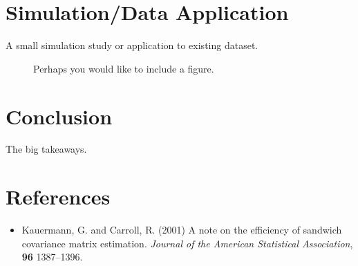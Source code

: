 \documentclass[english, 11pt]{article}
\begin{document}
\section{Simulation/Data Application}

A small simulation study or application to existing dataset.

\begin{figure}[H]
\begin{minipage}[t]{1\columnwidth}
\begin{center}
\par\end{center}%
\end{minipage}\protect\caption{Perhaps you would like to include a figure.}
\end{figure}









\section{Conclusion}

The big takeaways.







\section*{References}

\begin{itemize}

\item Kauermann, G. and Carroll, R. (2001)
A note on the efficiency of sandwich covariance matrix estimation. 
\textit{Journal of the American Statistical Association}, \textbf{96} 1387--1396.

\end{itemize}
\end{document}
